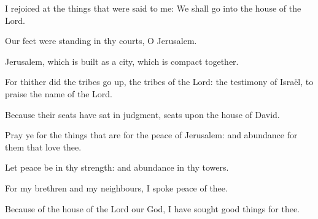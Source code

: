 ﻿\item I rejoiced at the things that were said to me: We shall go into the house of the Lord.
\item Our feet were standing in thy courts, O Jerusalem.
\item Jerusalem, which is built as a city, which is compact together.
\item For thither did the tribes go up, the tribes of the Lord: the testimony of Israël, to praise the name of the Lord.
\item Because their seats have sat in judgment, seats upon the house of David.
\item Pray ye for the things that are for the peace of Jerusalem: and abundance for them that love thee.
\item Let peace be in thy strength: and abundance in thy towers.
\item For my brethren and my neighbours, I spoke peace of thee.
\item Because of the house of the Lord our God, I have sought good things for thee.